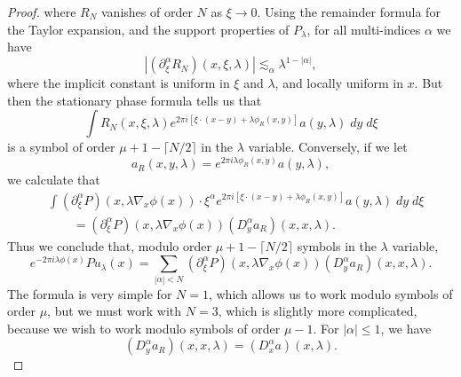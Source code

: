 \documentclass{article}
\theoremstyle{plain}
\theoremstyle{remark}
\theoremstyle{definition}
\begin{document}
\begin{proof}
	where $R_N$ vanishes of order $N$ as $\xi \to 0$. Using the remainder formula for the Taylor expansion, and the support properties of $P_\lambda$, for all multi-indices $\alpha$ we have
	\[ |(\partial_\xi^\alpha R_N)(x,\xi,\lambda)| \lesssim_\alpha \lambda^{1 - |\alpha|}, \]
	where the implicit constant is uniform in $\xi$ and $\lambda$, and locally uniform in $x$.
	But then the stationary phase formula tells us that
	\[ \int R_N(x,\xi,\lambda) e^{2 \pi i [ \xi \cdot (x - y) + \lambda \phi_R(x,y) ]} a(y,\lambda)\; dy\; d\xi \]
	is a symbol of order $\mu + 1 - \lceil N/2 \rceil$ in the $\lambda$ variable. Conversely, if we let
	\[ a_R(x,y,\lambda) = e^{2 \pi i \lambda \phi_R(x,y)} a(y,\lambda), \]
	we calculate that
	\begin{align*}
		&\int (\partial_\xi^\alpha P)(x, \lambda \nabla_x \phi(x)) \cdot \xi^\alpha e^{2 \pi i [\xi \cdot (x - y) + \lambda \phi_R(x,y)]} a(y,\lambda)\; dy\; d\xi\\
		&\quad\quad = (\partial_\xi^\alpha P)(x, \lambda \nabla_x \phi(x)) (D_y^\alpha a_R)(x,x,\lambda).
	\end{align*}
	Thus we conclude that, modulo order $\mu + 1 - \lceil N/2 \rceil$ symbols in the $\lambda$ variable,
	\[ e^{-2 \pi i \lambda \phi(x)} Pu_\lambda(x) = \sum_{|\alpha| < N} (\partial_\xi^\alpha P)(x, \lambda \nabla_x \phi(x)) (D^\alpha_y a_R)(x,x,\lambda). \]
	The formula is very simple for $N = 1$, which allows us to work modulo symbols of order $\mu$, but we must work with $N = 3$, which is slightly more complicated, because we wish to work modulo symbols of order $\mu - 1$. For $|\alpha| \leq 1$, we have
	\[ (D^\alpha_y a_R)(x,x,\lambda) = (D^\alpha_x a)(x,\lambda). \]

\end{proof}
\end{document}
